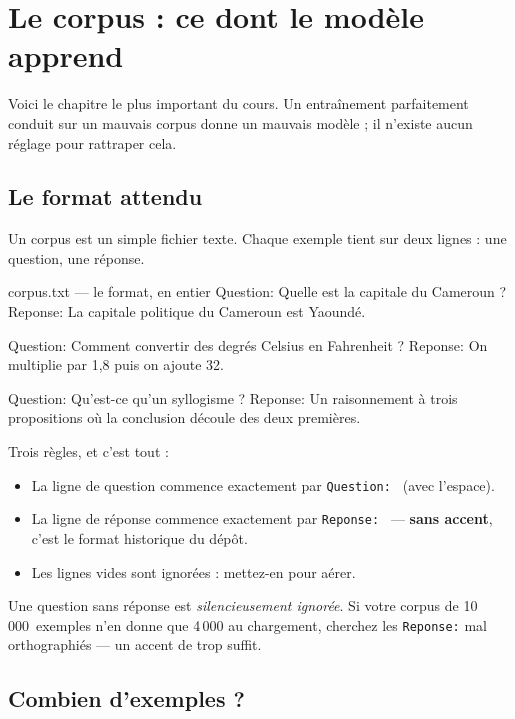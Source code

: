 \chapter{Le corpus : ce dont le modèle apprend}

Voici le chapitre le plus important du cours. Un entraînement parfaitement
conduit sur un mauvais corpus donne un mauvais modèle ; il n'existe aucun
réglage pour rattraper cela.

\section{Le format attendu}

Un corpus est un simple fichier texte. Chaque exemple tient sur deux lignes :
une question, une réponse.

\begin{nkcode}[]{corpus.txt — le format, en entier}
Question: Quelle est la capitale du Cameroun ?
Reponse: La capitale politique du Cameroun est Yaoundé.

Question: Comment convertir des degrés Celsius en Fahrenheit ?
Reponse: On multiplie par 1,8 puis on ajoute 32.

Question: Qu'est-ce qu'un syllogisme ?
Reponse: Un raisonnement à trois propositions où la conclusion découle
des deux premières.
\end{nkcode}

Trois règles, et c'est tout :

\begin{itemize}
  \item La ligne de question commence exactement par \texttt{Question:{} }
        (avec l'espace).
  \item La ligne de réponse commence exactement par \texttt{Reponse:{} } —
        \textbf{sans accent}, c'est le format historique du dépôt.
  \item Les lignes vides sont ignorées : mettez-en pour aérer.
\end{itemize}

\begin{nkpiege}
Une question sans réponse est \emph{silencieusement ignorée}. Si votre corpus
de 10\,000~exemples n'en donne que 4\,000 au chargement, cherchez les
\texttt{Reponse:} mal orthographiés — un accent de trop suffit.
\end{nkpiege}

\section{Combien d'exemples ?}

